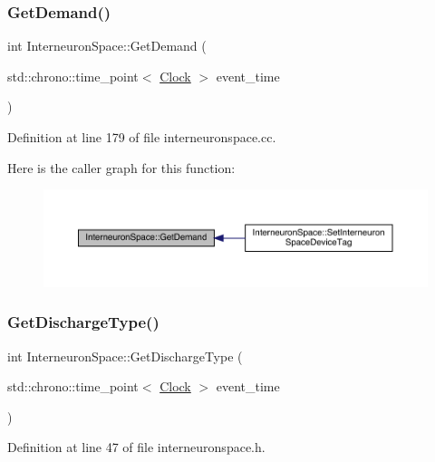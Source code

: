 \subsubsection{\texorpdfstring{Get\+Demand()}{GetDemand()}}
{\footnotesize\ttfamily int Interneuron\+Space\+::\+Get\+Demand (\begin{DoxyParamCaption}\item[{std\+::chrono\+::time\+\_\+point$<$ \hyperlink{universe_8h_a0ef8d951d1ca5ab3cfaf7ab4c7a6fd80}{Clock} $>$}]{event\+\_\+time }\end{DoxyParamCaption})}



Definition at line 179 of file interneuronspace.\+cc.

Here is the caller graph for this function\+:\nopagebreak
\begin{figure}[H]
\begin{center}
\leavevmode
\includegraphics[width=350pt]{class_interneuron_space_ae62237c3a84893c81e9998602ab16718_icgraph}
\end{center}
\end{figure}
\mbox{\label{class_interneuron_space_ae65bf091b84fa11459ef754ed1c7bf21}} 
\subsubsection{\texorpdfstring{Get\+Discharge\+Type()}{GetDischargeType()}}
{\footnotesize\ttfamily int Interneuron\+Space\+::\+Get\+Discharge\+Type (\begin{DoxyParamCaption}\item[{std\+::chrono\+::time\+\_\+point$<$ \hyperlink{universe_8h_a0ef8d951d1ca5ab3cfaf7ab4c7a6fd80}{Clock} $>$}]{event\+\_\+time }\end{DoxyParamCaption})\hspace{0.3cm}{\ttfamily [inline]}}



Definition at line 47 of file interneuronspace.\+h.

